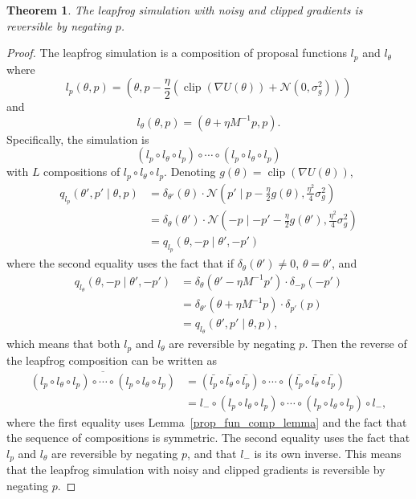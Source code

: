 \documentclass[english,twoside,openright]{HYgraduMLDS}
\newtheorem{theorem}{Theorem}
\newcommand{\caln}{{\mathcal{N}}}
\DeclareMathOperator{\clip}{clip}
\begin{document}
\begin{theorem}\label{leapfrog_revers_theorem}
  The leapfrog simulation with noisy and clipped gradients is reversible by
  negating \(p\).
\end{theorem}
\begin{proof}
  The leapfrog simulation is a composition of proposal functions
  \(l_{p}\) and \(l_{\theta}\) where
  \[
    l_{p}(\theta, p) = \left(\theta, p - \frac{\eta}{2}(\clip(\nabla U(\theta))
      + \caln(0, \sigma_{g}^{2}))\right)
  \]
  and
  \[
    l_{\theta}(\theta, p) = (\theta + \eta M^{-1}p, p).
  \]
  Specifically, the simulation is
  \[
    (l_{p} \circ l_{\theta}\circ l_{p})\circ
    \dotsb \circ (l_{p}\circ l_{\theta}\circ l_{p})
  \]
  with \(L\) compositions of \(l_{p} \circ l_{\theta}\circ l_{p}\).
  Denoting \(g(\theta) = \clip(\nabla U(\theta))\),
  \begin{align*}
    q_{l_{p}}(\theta', p'\mid \theta, p) &= \delta_{\theta'}(\theta)
    \cdot \caln\left(p'\mid p - \frac{\eta}{2}g(\theta), \frac{\eta^{2}}{4}\sigma_{g}^{2}\right)
    \\&= \delta_{\theta}(\theta')
    \cdot \caln\left(-p\mid -p' - \frac{\eta}{2}g(\theta'), \frac{\eta^{2}}{4}\sigma_{g}^{2}\right)
    \\&= q_{l_{p}}(\theta, -p\mid \theta', -p')
  \end{align*}
  where the second equality uses the fact that if
  \(\delta_{\theta}(\theta')\neq 0\), \(\theta = \theta'\),
  and
  \begin{align*}
	q_{l_{\theta}}(\theta, -p\mid \theta', -p')
    &= \delta_{\theta}(\theta' - \eta M^{-1}p')\cdot\delta_{-p}(-p')
    \\&= \delta_{\theta'}(\theta + \eta M^{-1}p)\cdot\delta_{p'}(p)
	\\&= q_{l_{\theta}}(\theta', p'\mid \theta, p),
  \end{align*}
  which means that both \(l_{p}\) and \(l_{\theta}\) are reversible by
  negating \(p\). Then the reverse of the leapfrog composition can be
  written as
  \begin{align*}
	\overline{(l_{p} \circ l_{\theta}\circ l_{p})\circ
    \dotsb \circ (l_{p}\circ l_{\theta}\circ l_{p})}
    &= (\bar{l_{p}}\circ \bar{l_{\theta}} \circ \bar{l_{p}}) \circ \dotsb \circ
    (\bar{l_{p}}\circ \bar{l_{\theta}} \circ \bar{l_{p}})
    \\&= l_{-}\circ(l_{p}\circ l_{\theta} \circ l_{p}) \circ \dotsb \circ
    (l_{p}\circ l_{\theta} \circ l_{p})\circ l_{-},
  \end{align*}
  where the first equality uses Lemma~\ref{prop_fun_comp_lemma} and
  the fact that the sequence of compositions is symmetric.
  The second equality uses the fact that \(l_{p}\) and \(l_{\theta}\)
  are reversible by negating \(p\), and that \(l_{-}\) is its own inverse.
  This means that the leapfrog simulation with noisy and clipped gradients is
  reversible by negating \(p\).
\end{proof}
\end{document}
